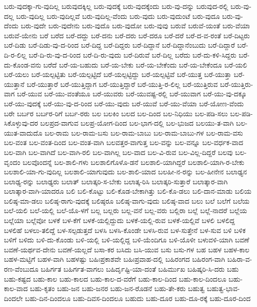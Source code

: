 {ಬರು-ವುದಕ್ಕಾ-ಗು-ವುದಿಲ್ಲ
ಬರುವುದಕ್ಕಿಲ್ಲ
ಬರು-ವುದಕ್ಕೆ
ಬರು-ವುದಕ್ಕೆಂದು
ಬರು-ವು-ದನ್ನು
ಬರುವುದ-ರಲ್ಲಿ
ಬರು-ವು-ದಲ್ಲ
ಬರು-ವುದಿಲ್ಲ
ಬರು-ವುದಿಲ್ಲವೆ
ಬರು-ವುದಿಲ್ಲ-ವೆಂದು
ಬರು-ವುದು
ಬರು-ವುದುಂಟೆ
ಬರು-ವುದೂ
ಬರು-ವು-ದೆಂದು
ಬರು-ವುದೇ
ಬರು-ವುದೇನು
ಬರು-ವುದೊ
ಬರು-ವುದೋ
ಬರು-ವುವು
ಬರುವೆ
ಬರುವೆ-ಯಂತೆ
ಬರು-ವೆಯಾ
ಬರುವೆ-ಯೇನು
ಬರೆ
ಬರೆದ
ಬರೆ-ದದ್ದು
ಬರೆ-ದನು
ಬರೆ-ದರು
ಬರೆ-ದರೂ
ಬರೆ-ದರೆ
ಬರೆ-ದ-ವ-ರಂತೆ
ಬರೆ-ದಿಟ್ಟರು
ಬರೆ-ದಿಡು
ಬರೆ-ದಿಡು-ವು-ದ-ರಿಂದ
ಬರೆ-ದಿದ್ದ
ಬರೆ-ದಿದ್ದರು
ಬರೆ-ದಿದ್ದಾನೆ
ಬರೆ-ದಿದ್ದಾನೆಂಬುದು
ಬರೆ-ದಿದ್ದಾರೆ
ಬರೆ-ದಿ-ರ-ಲಿಲ್ಲ
ಬರೆ-ದಿ-ರು-ವು-ದ-ರಿಂದ
ಬರೆ-ದಿ-ರು-ವುದು
ಬರೆ-ದಿರುವೆ
ಬರೆ-ದಿಲ್ಲ
ಬರೆದು
ಬರೆ-ದು-ಕಳಿ-ಸಿದ್ದರು
ಬರೆ-ದು-ಕೊಂಡ-ವನು
ಬರೆದೆ
ಬರೆ-ಯ-ಬಹುದು
ಬರೆ-ಯ-ಬೇಕು
ಬರೆ-ಯ-ಬೇಕೆಂದು
ಬರೆ-ಯ-ಬೇಕೆಂದೂ
ಬರೆ-ಯಲಿ
ಬರೆ-ಯಲು
ಬರೆ-ಯಲ್ಪಟ್ಟಿತು
ಬರೆ-ಯಲ್ಪಟ್ಟಿದೆ
ಬರೆ-ಯಲ್ಪಟ್ಟಿದ್ದು
ಬರೆ-ಯಲ್ಪಟ್ಟಿವೆ
ಬರೆ-ಯುತ್ತ
ಬರೆ-ಯುತ್ತಾ
ಬರೆ-ಯುತ್ತಾನೆ
ಬರೆ-ಯುತ್ತಾರೆ
ಬರೆ-ಯುತ್ತಿದ್ದಾಗ
ಬರೆ-ಯುತ್ತಿದ್ದಾರೆ
ಬರೆ-ಯುತ್ತಿ-ರ-ಲಿಲ್ಲ
ಬರೆ-ಯುತ್ತಿರುವ
ಬರೆ-ಯುತ್ತಿರು-ವಾಗ
ಬರೆ-ಯುವ
ಬರೆ-ಯು-ವಂತೆಯೂ
ಬರೆ-ಯುವರು
ಬರೆ-ಯುವಷ್ಟ-ರಲ್ಲಿ
ಬರೆ-ಯುವಾಗ
ಬರೆ-ಯು-ವು-ದಕ್ಕೂ
ಬರೆ-ಯು-ವುದಕ್ಕೆ
ಬರೆ-ಯು-ವು-ದ-ರಿಂದ
ಬರೆ-ಯು-ವುದು
ಬರೆ-ಯುವೆ
ಬರೆ-ಯು-ವೆಯಾ
ಬರೆ-ಯೋಣ-ವೆಂದು
ಬರೇ
ಬರ್ಬರ
ಬರ್ಬರ-ರಿಗೆ
ಬರ್ಬ-ರರು
ಬಲ
ಬಲಕಿಂ
ಬಲದ
ಬಲ-ದಿಂದ
ಬಲ-ನಿಧಿಯು
ಬಲ-ಪಡಿ-ಸಲು
ಬಲ-ಪಡಿ-ಸಿಕೊಳ್ಳುವು-ದರ
ಬಲಪ್ರದ-ವಾಗುವ
ಬಲಪ್ರ-ಯೋಗ-ದಿಂದ
ಬಲ-ಭಾಗ-ದಲ್ಲಿ
ಬಲ-ಭುಜದ
ಬಲಯು-ತ-ವಾಗಿ
ಬಲ-ಯುತ-ವಾದುದೊ
ಬಲ-ರಾಮ
ಬಲ-ರಾಮ-ಬಸು
ಬಲ-ರಾಮ-ಬಾಬು
ಬಲ-ರಾಮ-ಬಾಬು-ಗಳ
ಬಲ-ರಾಮ-ವಸು
ಬಲ-ವಂತ
ಬಲ-ವಂತ-ದಿಂದ
ಬಲ-ವಂತ-ವಾಗಿ
ಬಲವತ್ತರ-ವಾಗುತ್ತ
ಬಲ-ವನ್ನು
ಬಲ-ವನ್ನೂ
ಬಲ-ವರ್ಧಕ-ವಾದ
ಬಲ-ವಾಗಿ
ಬಲ-ವಾಗಿದೆ
ಬಲ-ವಾಗಿ-ರಲಿ
ಬಲ-ವಾಗಿಲ್ಲ
ಬಲ-ವಾದ
ಬಲ-ವಿ-ರುವ
ಬಲ-ವಿಲ್ಲ-ದಿದ್ದರೆ
ಬಲವು
ಬಲ-ವೃಂದಂ
ಬಲವೊಂದನ್ನೆ
ಬಲ-ಶಾಲಿ-ಗಳು
ಬಲಶಾಲಿಗೊಳೊ-ಡನೆ
ಬಲಶಾಲಿ-ಯಾಗಿದ್ದರೆ
ಬಲಶಾಲಿ-ಯಾಗಿ-ರ-ಬೇಕು
ಬಲಶಾಲಿ-ಯಾ-ಗು-ವುದಿಲ್ಲ
ಬಲಶಾಲಿ-ಯಾಗುವುದು
ಬಲ-ಶಾಲಿ-ಯಾದ
ಬಲಹೀ-ನ-ರನ್ನು
ಬಲ-ಹೀನೇನ
ಬಲಾಢ್ಯನ
ಬಲಾಢ್ಯ-ರನ್ನು
ಬಲಾಢ್ಯರು
ಬಲಾತ್
ಬಲಾತ್ಕರಿ-ಸ-ಬೇಕು
ಬಲಾತ್ಕ-ರಿಸಿ
ಬಲಾತ್ಕರಿ-ಸುತ್ತಾರೆ
ಬಲಾತ್ಕಾರ-ವಾಗಿ
ಬಲಾತ್ಕಾರ-ವಾಗಿ-ಯಾದರೂ
ಬಲಿ
ಬಲಿ-ಕೊಟ್ಟು
ಬಲಿ-ಕೊಡ-ಬೇಕಾಗಿತ್ತು
ಬಲಿ-ಕೊ-ಡಲು
ಬಲಿ-ದಾನ-ಮಾಡು
ಬಲಿಯ
ಬಲಿಷ್ಠ-ಮಾ-ಡಲು
ಬಲಿಷ್ಠ-ರಾಗು-ವುದಕ್ಕೆ
ಬಲಿಷ್ಠರೂ
ಬಲಿಷ್ಠ-ವಾಗು-ವುದು
ಬಲಿಷ್ಠ-ವಾದ
ಬಲು
ಬಲೆ
ಬಲೆಗೆ
ಬಲೆಯ
ಬಲೆ-ಯಲಿ
ಬಲೆ-ಯಲ್ಲಿ
ಬಲೆ-ಯೊ-ಳಗೆ
ಬಲ್ಲ
ಬಲ್ಲರು
ಬಲ್ಲ-ವನೆ
ಬಲ್ಲ-ವರು
ಬಲ್ಲಿರಾ
ಬಲ್ಲೆ
ಬಲ್ಲೆ-ನಾದರೆ
ಬಲ್ಲೆಯ
ಬಲ್ಲೆಯಾ
ಬಲ್ಲೆವೋ
ಬಳಕೆ
ಬಳ-ಕೆಗೆ
ಬಳಕೆ-ಯಲ್ಲಿದ್ದುದು
ಬಳಕೆ-ಯಲ್ಲಿ-ರುವ
ಬಳಕೆ-ಯಲ್ಲಿವೆ
ಬಳಲಿ
ಬಳಲಿದ್ದ
ಬಳಲಿಹೆ
ಬಳಲು-ತಲಿದ್ದೆ
ಬಳ-ಸಲ್ಪಡುತ್ತದೆ
ಬಳಸಿ
ಬಳಸಿ-ಕೊಂಡೇ
ಬಳಸಿ-ರುವ
ಬಳ-ಸುತ್ತೇನೆ
ಬಳ-ಸುವ
ಬಳಿ
ಬಳಿಕ
ಬಳಿಗೆ
ಬಳಿದು
ಬಳಿ-ದು-ಕೊಂಡು
ಬಳಿ-ಯಲ್ಲಿ
ಬಳಿ-ಯಲ್ಲಿದ್ದ
ಬಳಿ-ಯೆಂದಿಗೂ
ಬಳಿ-ಯೊಳೀ
ಬಳುವಳಿ-ಯಾಗಿ
ಬವಣೆ
ಬವಣೆ-ಯರ್ಥವ-ದೇನು
ಬವಣೆ-ಯಲ್ಲದೆ
ಬಸಾ-ಕರ
ಬಸಿದು
ಬಸಿ-ಯುವ
ಬಸು
ಬಸು-ಗಳ
ಬಹ
ಬಹಳ
ಬಹಳ-ಕಾಲ
ಬಹಳ-ಮಟ್ಟಿಗೆ
ಬಹಳ-ವಾಗಿ
ಬಹಳಷ್ಟು
ಬಹಿಃಪ್ರಕಾಶವೇ
ಬಹಿಃಪ್ರವಾಹ-ದಲ್ಲಿ
ಬಹಿರಂಗದ
ಬಹಿರಂಗ-ವಾಗಿ
ಬಹಿರಾ-ವ-ರಣ-ವೆಂಬುದೂ
ಬಹಿರ್ಗತ
ಬಹಿರ್ಗತ-ವಾಗಲು
ಬಹಿರ್ದೃಷ್ಟಿ-ಯಾ-ದಂತೆ
ಬಹಿರ್ಮುಖ
ಬಹಿಷ್ಕರಿ-ಸಿ-ದರು
ಬಹು
ಬಹು-ಕಷ್ಟದ
ಬಹು-ಕಾಲ
ಬಹು-ಕಾಲದ
ಬಹು-ಕಾಲ-ದ-ವರೆಗೆ
ಬಹು-ಕಾಲ-ದಿಂದ
ಬಹು-ಕಾಲ-ದಿಂದಲೂ
ಬಹು-ಕಾಲ-ವಾದ
ಬಹು-ಕೃತಂ
ಬಹು-ಜನ
ಬಹು-ಜನರ
ಬಹು-ಜನ-ರೊಡನೆ
ಬಹು-ತೇ-ಕರು
ಬಹುತ್ವ
ಬಹುತ್ವ-ಭಾವ-ದಿಂದಲೇ
ಬಹು-ದಿನ-ದಿಂದಲೂ
ಬಹು-ದಿವಸ-ದಿಂದಲೂ
ಬಹುದು
ಬಹು-ದೂರ
ಬಹು-ದೂ-ರಕ್ಕೆ
ಬಹು-ದೂರ-ದಿಂದ
}
